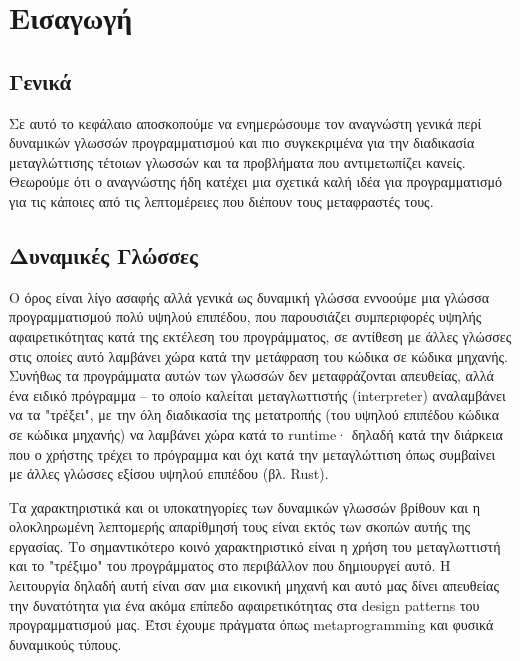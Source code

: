 
\chapter{Εισαγωγή}
\label{chapter1} %

\section{Γενικά}

Σε αυτό το κεφάλαιο αποσκοπούμε να ενημερώσουμε τον αναγνώστη γενικά περί
δυναμικών γλωσσών προγραμματισμού και πιο συγκεκριμένα για την διαδικασία
μεταγλώττισης τέτοιων γλωσσών και τα προβλήματα που αντιμετωπίζει κανείς.
Θεωρούμε ότι ο αναγνώστης ήδη κατέχει μια σχετικά καλή ιδέα για προγραμματισμό
για τις κάποιες από τις λεπτομέρειες που διέπουν τους μεταφραστές τους.


\section{Δυναμικές Γλώσσες}

Ο όρος είναι λίγο ασαφής αλλά γενικά ως δυναμική γλώσσα εννοούμε μια γλώσσα
προγραμματισμού πολύ υψηλού επιπέδου, που παρουσιάζει συμπεριφορές υψηλής
αφαιρετικότητας κατά της εκτέλεση του προγράμματος, σε αντίθεση με άλλες γλώσσες
στις οποίες αυτό λαμβάνει χώρα κατά την μετάφραση του κώδικα σε κώδικα μηχανής.
Συνήθως τα προγράμματα αυτών των γλωσσών δεν μεταφράζονται απευθείας, αλλά ένα
ειδικό πρόγραμμα – το οποίο καλείται μεταγλωττιστής (interpreter) αναλαμβάνει να
τα "τρέξει", με την όλη διαδικασία της μετατροπής (του υψηλού επιπέδου κώδικα σε
κώδικα μηχανής) να λαμβάνει χώρα κατά το runtime· δηλαδή κατά την διάρκεια που ο
χρήστης τρέχει το πρόγραμμα και όχι κατά την μεταγλώττιση όπως συμβαίνει με
άλλες γλώσσες εξίσου υψηλού επιπέδου (βλ. Rust).

Τα χαρακτηριστικά και οι υποκατηγορίες των δυναμικών γλωσσών βρίθουν και η
ολοκληρωμένη λεπτομερής απαρίθμησή τους είναι εκτός των σκοπών αυτής της
εργασίας. Το σημαντικότερο κοινό χαρακτηριστικό είναι η χρήση του μεταγλωττιστή
και το "τρέξιμο" του προγράμματος στο περιβάλλον που δημιουργεί αυτό. Η
λειτουργία δηλαδή αυτή είναι σαν μια εικονική μηχανή και αυτό μας δίνει
απευθείας την δυνατότητα για ένα ακόμα επίπεδο αφαιρετικότητας στα design
patterns του προγραμματισμού μας. Έτσι έχουμε πράγματα όπως metaprogramming και
φυσικά δυναμικούς τύπους.


